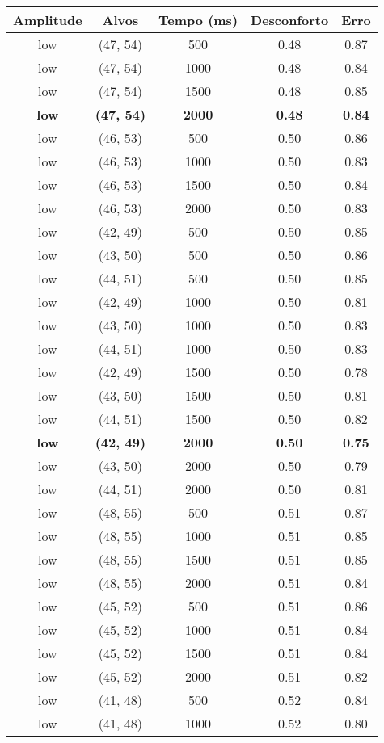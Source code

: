 \begin{tabular}{c c c c c}
\hline
Amplitude & Alvos & Tempo (ms) & Desconforto & Erro \\
\hline
low & (47, 54) &  500 & 0.48 & 0.87 \\
low & (47, 54) &  1000 & 0.48 & 0.84 \\
low & (47, 54) &  1500 & 0.48 & 0.85 \\
\textbf{low} & \textbf{(47, 54)} & \textbf{ 2000} & \textbf{0.48} & \textbf{0.84} \\
low & (46, 53) &  500 & 0.50 & 0.86 \\
low & (46, 53) &  1000 & 0.50 & 0.83 \\
low & (46, 53) &  1500 & 0.50 & 0.84 \\
low & (46, 53) &  2000 & 0.50 & 0.83 \\
low & (42, 49) &  500 & 0.50 & 0.85 \\
low & (43, 50) &  500 & 0.50 & 0.86 \\
low & (44, 51) &  500 & 0.50 & 0.85 \\
low & (42, 49) &  1000 & 0.50 & 0.81 \\
low & (43, 50) &  1000 & 0.50 & 0.83 \\
low & (44, 51) &  1000 & 0.50 & 0.83 \\
low & (42, 49) &  1500 & 0.50 & 0.78 \\
low & (43, 50) &  1500 & 0.50 & 0.81 \\
low & (44, 51) &  1500 & 0.50 & 0.82 \\
\textbf{low} & \textbf{(42, 49)} & \textbf{ 2000} & \textbf{0.50} & \textbf{0.75} \\
low & (43, 50) &  2000 & 0.50 & 0.79 \\
low & (44, 51) &  2000 & 0.50 & 0.81 \\
low & (48, 55) &  500 & 0.51 & 0.87 \\
low & (48, 55) &  1000 & 0.51 & 0.85 \\
low & (48, 55) &  1500 & 0.51 & 0.85 \\
low & (48, 55) &  2000 & 0.51 & 0.84 \\
low & (45, 52) &  500 & 0.51 & 0.86 \\
low & (45, 52) &  1000 & 0.51 & 0.84 \\
low & (45, 52) &  1500 & 0.51 & 0.84 \\
low & (45, 52) &  2000 & 0.51 & 0.82 \\
low & (41, 48) &  500 & 0.52 & 0.84 \\
low & (41, 48) &  1000 & 0.52 & 0.80 \\

\end{tabular}

